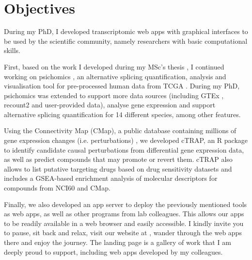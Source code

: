 \chapter{Objectives}

During my PhD, I developed transcriptomic web apps with graphical interfaces to be used by the scientific community, namely researchers with basic computational skills.

First, based on the work I developed during my MSc's thesis \cite{}, I continued working on psichomics \cite{saraiva-agostinho:2018uq,saraiva-agostinho:2020wz}, an alternative splicing quantification, analysis and visualisation tool for pre-processed human data from TCGA \cite{chang:2013ww}. During my PhD, psichomics was extended to support more data sources (including GTEx \cite{lonsdale:2013uo}, recount2 \cite{collado-torres:2017uw} and user-provided data), analyse gene expression and support alternative splicing quantification for 14 different species, among other features.

Using the Connectivity Map (CMap), a public database containing millions of gene expression changes (i.e. perturbations) \cite{subramanian:2017ul}, we developed cTRAP, an R package to identify candidate causal perturbations from differential gene expression data, as well as predict compounds that may promote or revert them. cTRAP also allows to list putative targeting drugs based on drug sensitivity datasets and includes a GSEA-based enrichment analysis of molecular descriptors for compounds from NCI60 and CMap.

Finally, we also developed an app server to deploy the previously mentioned tools as web apps, as well as other programs from lab colleagues. This allows our apps to be readily available in a web browser and easily accessible. I kindly invite you to pause, sit back and relax, visit our website at , wander through the web apps there and enjoy the journey. The landing page is a gallery of work that I am deeply proud to support, including web apps developed by my colleagues.
